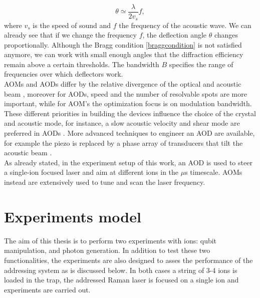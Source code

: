 \begin{equation}
\theta \simeq \frac{\lambda}{2 v_s}f,
\end{equation}
where $v_s$ is the speed of sound and $f$ the frequency of the acoustic wave. We can already see that if we change the frequency $f$, the deflection angle $\theta$ changes proportionally. Although the Bragg condition \eqref{braggcondition} is not satisfied anymore, we can work with small enough angles that the diffraction efficiency remain above a certain thresholds. The bandwidth $B$ specifies the range of frequencies over which deflectors work.\\
AOMs and AODs differ by the relative divergence of the optical and acoustic beam \cite{handbookoptics}, moreover for AODs, speed and the number of resolvable spots are more important, while for AOM's the optimization focus is on modulation bandwidth. These different priorities in building the devices influence
the choice of the crystal and acoustic mode, for instance, a slow acoustic velocity and shear mode are preferred in AODs \cite{handbookoptics}. More advanced techniques to engineer an AOD are available, for example the piezo is replaced by a phase array of transducers that tilt the acoustic beam \cite{phasedarray}.\\
As already stated, in the experiment setup of this work, an AOD is used to steer a single-ion focused laser and aim at different ions in the $\mu$s timescale. AOMs instead are extensively used to tune and scan the laser frequency.

\section{Experiments model}
The aim of this thesis is to perform two experiments with ions: qubit manipulation, and photon generation. In addition to test these two functionalities, the experiments are also designed to asses the performance of the addressing system as is discussed below. In both cases a string of 3-4 ions is loaded in the trap, the addressed Raman laser is focused on a single ion and experiments are carried out.

